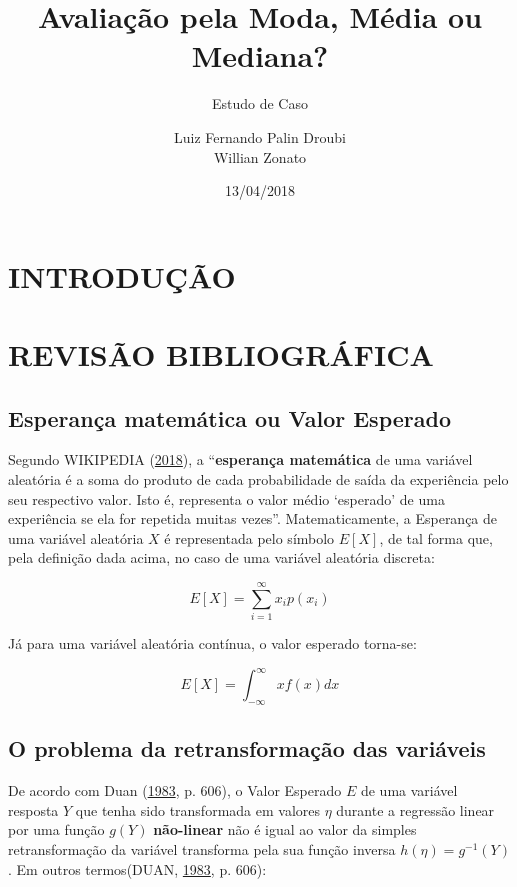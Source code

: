 \documentclass[a4paper]{article}
\title{Avaliação pela Moda, Média ou Mediana?}
\subtitle{Estudo de Caso}
\author{Luiz Fernando Palin Droubi \\ Willian Zonato}
\date{13/04/2018}
\begin{document}
\maketitle

\section{INTRODUÇÃO}\label{introducao}

\section{REVISÃO BIBLIOGRÁFICA}\label{revisao-bibliografica}

\subsection{Esperança matemática ou Valor
Esperado}\label{esperanca-matematica-ou-valor-esperado}

Segundo WIKIPEDIA (\protect\hyperlink{ref-wiki:E}{2018}), a
``\textbf{esperança matemática} de uma variável aleatória é a soma do
produto de cada probabilidade de saída da experiência pelo seu
respectivo valor. Isto é, representa o valor médio `esperado' de uma
experiência se ela for repetida muitas vezes''. Matematicamente, a
Esperança de uma variável aleatória \(X\) é representada pelo símbolo
\(E[X]\), de tal forma que, pela definição dada acima, no caso de uma
variável aleatória discreta:

\[E[X] = \sum_{i = 1}^{\infty}x_ip(x_i)\]

Já para uma variável aleatória contínua, o valor esperado torna-se:

\[E[X] = \int_{-\infty}^{\infty}xf(x)dx\]

\subsection{O problema da retransformação das
variáveis}\label{o-problema-da-retransformacao-das-variaveis}

De acordo com Duan (\protect\hyperlink{ref-Duan}{1983}, p. 606), o Valor
Esperado \(E\) de uma variável resposta \(Y\) que tenha sido
transformada em valores \(\eta\) durante a regressão linear por uma
função \(g(Y)\) \textbf{não-linear} não é igual ao valor da simples
retransformação da variável transforma pela sua função inversa
\(h(\eta) = g^{-1}(Y)\). Em outros termos(DUAN,
\protect\hyperlink{ref-Duan}{1983}, p. 606):
\end{document}
